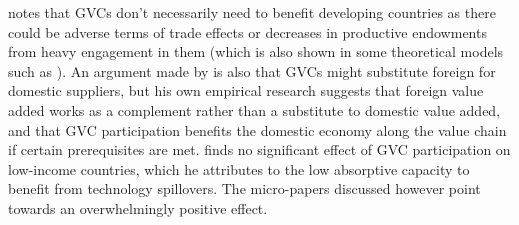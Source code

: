 \documentclass[a4paper]{article}
\begin{document}
\citet{Kummritz20161} notes that GVCs don't necessarily need to benefit developing countries as there could be adverse terms of trade effects or decreases in productive endowments from heavy engagement in them (which is also shown in some theoretical models such as \citet{baldwin2014trade}). An argument made by \citet{kummritz2015global} is also that GVCs might substitute foreign for domestic suppliers, but his own empirical research suggests that 
foreign value added works as a complement rather than a substitute to domestic value added, and that GVC participation benefits the domestic economy along the value chain if certain prerequisites are met.  \citet{kummritz2015global} finds no significant effect of GVC participation on low-income countries, which he attributes to the low absorptive capacity to benefit from technology spillovers. The micro-papers discussed however point towards an overwhelmingly positive effect. \newline






\end{document}
